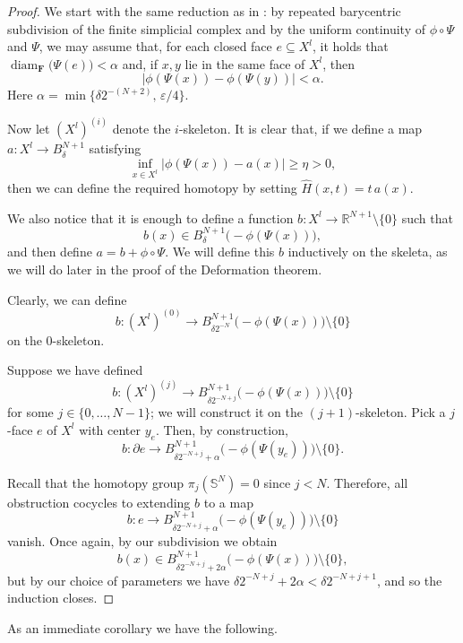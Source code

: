 \documentclass[12pt,english]{article}
\theoremstyle{definition}
\begin{document}
\begin{proof}
    We start with the same reduction as in \cite[Theorem~5.1]{MarquesNeves}: by repeated barycentric subdivision of the finite simplicial complex and by the uniform continuity of $\phi\circ\Psi$ and $\Psi$, we may assume that, for each closed face $e\subseteq X^l$, it holds that $\operatorname{diam}_\mathbf{F}\bigl(\Psi(e)\bigr)<\alpha$ and, if $x,y$ lie in the same face of $X^l$, then
    \begin{equation*}
        \bigl|\phi(\Psi(x))-\phi(\Psi(y))\bigr|<\alpha.
    \end{equation*}
    Here $\alpha=\min\{\delta 2^{-(N+2)},\,\varepsilon/4\}$.

    Now let $(X^l)^{(i)}$ denote the $i$-skeleton. It is clear that, if we define a map $a:X^l\rightarrow B^{N+1}_\delta$ satisfying
    \[
        \inf_{x\in X^l}\bigl|\phi(\Psi(x))-a(x)\bigr|\geq \eta>0,
    \]
    then we can define the required homotopy by setting $\hat H(x,t)=t\,a(x)$.

    We also notice that it is enough to define a function $b:X^l\rightarrow\mathbb R^{N+1}\setminus\{0\}$ such that
    \[
        b(x)\in B^{N+1}_\delta\bigl(-\phi(\Psi(x))\bigr),
    \]
    and then define $a=b+\phi\circ\Psi$. We will define this $b$ inductively on the skeleta, as we will do later in the proof of the Deformation theorem.

    Clearly, we can define
    \[
        b:(X^l)^{(0)}\rightarrow B^{N+1}_{\delta 2^{-N}}\bigl(-\phi(\Psi(x))\bigr)\setminus\{0\}
    \]
    on the $0$-skeleton.

    Suppose we have defined
    \[
        b:(X^l)^{(j)}\rightarrow B^{N+1}_{\delta 2^{-N+j}}\bigl(-\phi(\Psi(x))\bigr)\setminus\{0\}
    \]
    for some $j\in\{0,\dots,N-1\}$; we will construct it on the $(j+1)$-skeleton. Pick a $j$-face $e$ of $X^l$ with center $y_e$. Then, by construction,
    \[
        b:\partial e\rightarrow B^{N+1}_{\delta 2^{-N+j}+\alpha}\bigl(-\phi(\Psi(y_e))\bigr)\setminus\{0\}.
    \]

    Recall that the homotopy group $\pi_j(\mathbb S^N)=0$ since $j<N$. Therefore, all obstruction cocycles to extending $b$ to a map
    \[
        b:e\rightarrow B^{N+1}_{\delta 2^{-N+j}+\alpha}\bigl(-\phi(\Psi(y_e))\bigr)\setminus\{0\}
    \]
    vanish. Once again, by our subdivision we obtain
    \[
        b(x)\in B^{N+1}_{\delta 2^{-N+j}+2\alpha}\bigl(-\phi(\Psi(x))\bigr)\setminus\{0\},
    \]
    but by our choice of parameters we have $\delta 2^{-N+j}+2\alpha<\delta 2^{-N+j+1}$, and so the induction closes.
\end{proof}
As an immediate corollary we have the following.
\end{document}
